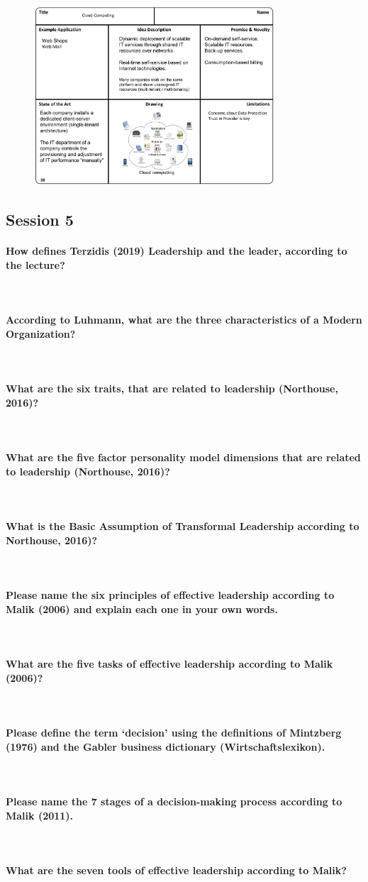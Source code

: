 \documentclass[10pt,a4paper,noendnumber=true]{scrartcl}
\newcommand{\properparagraph}[1]{\paragraph{\textcolor{Emerald}{#1}}\mbox{}\\}
\begin{document}
\begin{figure}[H]
	\centering
	\includegraphics[width = 0.8\textwidth]{img/cloud_canvas}
\end{figure}


\newpage
\subsection{Session 5}
\properparagraph{How defines Terzidis (2019) Leadership and the leader, according to the lecture?}
\properparagraph{ According to Luhmann, what are the three characteristics of a Modern Organization?}
\properparagraph{What are the six traits, that are related to leadership (Northouse, 2016)?}
\properparagraph{What are the five factor personality model dimensions that are related to leadership (Northouse, 2016)?}
\properparagraph{What is the Basic Assumption of Transformal Leadership according to Northouse, 2016)?}
\properparagraph{Please name the six principles of effective leadership according to Malik (2006) and explain	each one in your own words.}
\properparagraph{What are the five tasks of effective leadership according to Malik (2006)?}
\properparagraph{Please define the term ‘decision’ using the definitions of Mintzberg (1976) and the Gabler business dictionary (Wirtschaftslexikon).}
\properparagraph{Please name the 7 stages of a decision-making process according to Malik (2011).}
\properparagraph{What are the seven tools of effective leadership according to Malik?}

\newpage
\end{document}
